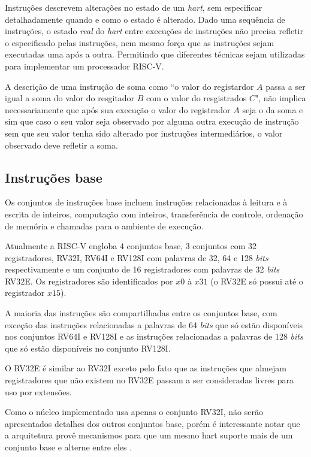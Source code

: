     Instruções descrevem alterações no estado de um \emph{hart}, sem especificar detalhadamente quando 
    e como o estado é alterado. Dado uma sequência de instruções, o estado \emph{real} do \emph{hart} 
    entre execuções de instruções não precisa refletir o especificado pelas instruções, nem mesmo 
    força que as instruções sejam executadas uma 
    após a outra. Permitindo que diferentes técnicas sejam utilizadas para implementar um processador RISC-V.

    A descrição de uma instrução de soma como ``o valor do registardor $A$ passa a ser igual a soma do 
    valor do resgitador $B$ com o valor do resgistrados $C$", não implica necessariamente que após sua execução
    o valor do registrador $A$ seja o da soma e sim que caso o seu valor seja observado por alguma outra execução de
    instrução sem que seu valor tenha sido alterado por instruções intermediários, o valor observado deve refletir a soma.

\subsection{Instruções base}
\label{sec:instBase}

    Os conjuntos de instruções base incluem instruções relacionadas à leitura e à escrita de 
    inteiros, computação com inteiros, transferência de controle, ordenação de memória e 
    chamadas para o ambiente de execução.

    Atualmente a RISC-V engloba 4 conjuntos base, 3 conjuntos com 32 registradores, RV32I, 
    RV64I e RV128I com palavras de 32, 64 e 128 \emph{bits} respectivamente e um conjunto de 
    16 registradores com palavras de 32 \emph{bits} RV32E. Os registradores são identificados 
    por $x0$ à $x31$ (o RV32E só possui até o registrador $x15$).

    A maioria das instruções são compartilhadas entre os conjuntos base, com exceção das 
    instruções relacionadas a palavras de 64 \emph{bits} que só estão disponíveis nos 
    conjuntos RV64I e RV128I e as instruções relacionadas a palavras de 128 \emph{bits} 
    que só estão disponíveis no conjunto RV128I.

    O RV32E é similar ao RV32I exceto pelo fato que as instruções que almejam 
    registradores que não existem no RV32E passam a ser consideradas livres para uso 
    por extensões.

    Como o núcleo implementado usa apenas o conjunto RV32I, não serão apresentados 
    detalhes dos outros conjuntos base, porém é interessante notar que a arquitetura 
    provê mecanismos para que um mesmo hart suporte mais de um conjunto base e alterne 
    entre eles \citep{RVS2}.

